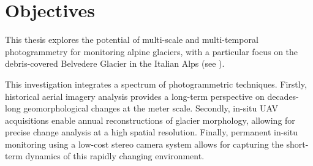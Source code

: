 



\section{Objectives}

This thesis explores the potential of multi-scale and multi-temporal photogrammetry 
for monitoring alpine glaciers, with a particular focus on the debris-covered Belvedere Glacier in the Italian Alps (see ).

This investigation integrates a spectrum of photogrammetric techniques.  
Firstly, historical aerial imagery analysis provides a long-term perspective on decades-long geomorphological changes at the meter scale.  
Secondly, in-situ UAV acquisitions enable annual reconstructions of glacier morphology, allowing for precise change analysis at a high spatial resolution.  
Finally, permanent in-situ monitoring using a low-cost stereo camera system allows for capturing the short-term dynamics of this rapidly changing environment.

